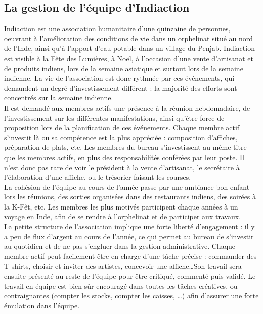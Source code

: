 \subsection{La gestion de l'équipe d'Indiaction}
Indiaction est une association humanitaire d'une quinzaine de personnes, oeuvrant à l'amélioration des conditions de vie dans un orphelinat situé au nord de l'Inde, ainsi qu'à l'apport d'eau potable dans un village du Penjab. Indiaction est visible à la Fête des Lumières, à Noël, à l'occasion d'une vente d'artisanat et de produits indiens, lors de la semaine asiatique et surtout lors de la semaine indienne. La vie de l'association est donc rythmée par ces événements, qui demandent un degré d'investissement différent : la majorité des efforts sont concentrés sur la semaine indienne.\\

Il est demandé aux membres actifs une présence à la réunion hebdomadaire, de l'investissement sur les différentes manifestations, ainsi qu'être force de proposition lors de la planification de ces événements. Chaque membre actif s'investit là ou sa compétence est la plus appréciée  : composition d'affiches, préparation de plats, etc. Les membres du bureau s'investissent au même titre que les membres actifs, en plus des responsabilités conférées par leur poste. Il n'est donc pas rare de voir le président à la vente d'artisanat, le secrétaire à l'élaboration d'une affiche, ou le trésorier faisant les courses.\\

La cohésion de l'équipe au cours de l'année passe par une ambiance \og bon enfant \fg{}{} lors les réunions, des sorties organisées dans des restaurants indiens, des soirées à la K-Fêt, etc. Les membres les plus motivés participent chaque années à un voyage en Inde, afin de se rendre à l'orphelinat et de participer aux travaux.\\

La petite structure de l'association implique une forte liberté d'engagement : il y a peu de flux d'argent au cours de l'année, ce qui permet au bureau de s'investir au quotidien et de ne pas s'\og engluer \fg{} dans la gestion administrative. Chaque membre actif peut facilement être en charge d'une tâche précise : commander des T-shirts, choisir et inviter des artistes, concevoir une affiche\ldots Son travail sera ensuite présenté au reste de l'équipe pour être critiqué, commenté puis validé. Le travail en équipe est bien sûr encouragé dans toutes les tâches créatives, ou contraignantes (compter les stocks, compter les caisses, \ldots) afin d'assurer une forte émulation dans l'équipe.

